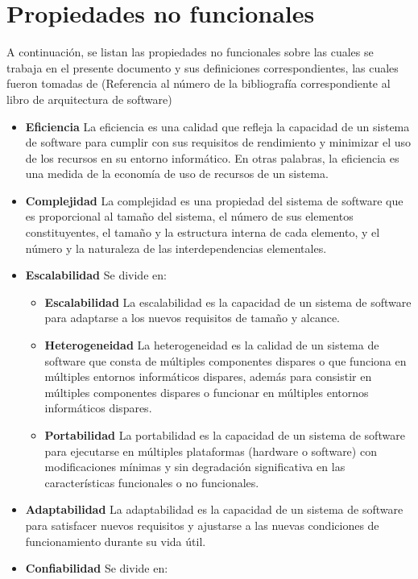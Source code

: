 \chapter{Propiedades no funcionales}
A continuación, se listan las propiedades no funcionales sobre las cuales se trabaja en el presente documento y sus definiciones correspondientes, las cuales fueron tomadas de (Referencia al número de la bibliografía correspondiente al libro de arquitectura de software)

\begin{itemize}
	\item \textbf{Eficiencia} La eficiencia es una calidad que refleja la capacidad de un sistema de software para cumplir con sus requisitos de rendimiento y minimizar el uso de los recursos en su entorno informático. En otras palabras, la eficiencia es una medida de la economía de uso de recursos de un sistema.
	\item \textbf{Complejidad} La complejidad es una propiedad del sistema de software que es proporcional al tamaño del sistema, el número de sus elementos constituyentes, el tamaño y la estructura interna de cada elemento, y el número y la naturaleza de las interdependencias elementales.
	\item \textbf{Escalabilidad} Se divide en:
		\begin{itemize}
			\item \textbf{Escalabilidad} La escalabilidad es la capacidad de un sistema de software para adaptarse a los nuevos requisitos de tamaño y alcance.
			\item \textbf{Heterogeneidad} La heterogeneidad es la calidad de un sistema de software que consta de múltiples componentes dispares o que funciona en múltiples entornos informáticos dispares, además para consistir en múltiples componentes dispares o funcionar en múltiples entornos informáticos dispares.
			\item \textbf{Portabilidad} La portabilidad es la capacidad de un sistema de software para ejecutarse en múltiples plataformas (hardware o software) con modificaciones mínimas y sin degradación significativa en las características funcionales o no funcionales.
		\end{itemize}
	\item \textbf{Adaptabilidad} La adaptabilidad es la capacidad de un sistema de software para satisfacer nuevos requisitos y ajustarse a las nuevas condiciones de funcionamiento durante su vida útil.
	\item \textbf{Confiabilidad} Se divide en:

\end{itemize}
